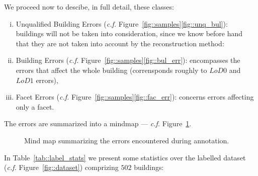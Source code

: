 \documentclass[a4paper, 11pt]{article}
\begin{document}
	We proceed now to descibe, in full detail, these classes:

	\begin{enumerate}[(i)]
		\item Unqualified Building Errors (\textit{c.f.} Figure~\ref{fig::samples}\ref{fig::unq_bul}): buildings will not be taken into consideration, since we know before hand that they are not taken into account by the reconstruction method:
		\item Building Errors (\textit{c.f.} Figure~\ref{fig::samples}\ref{fig::bul_err}): encompasses the errors that affect the whole building (corrensponds roughly to $LoD0$ and $LoD1$ errors),
		\item Facet Errors (\textit{c.f.} Figure~\ref{fig::samples}\ref{fig::fac_err}): concerns errors affecting only a facet.
	\end{enumerate}

	The errors are summarized into a mindmap --- \textit{c.f.} Figure~\ref{fig::mindmap_errors}.

	\begin{figure}
		\begin{center}
			
			\caption{\label{fig::mindmap_errors} Mind map summarizing the errors encountered during annotation.}
		\end{center}
	\end{figure}

	In Table~\ref{tab::label_stats} we present some statistics over the labelled dataset (\textit{c.f.} Figure~\ref{fig::dataset}) comprizing $502$ buildings:
\end{document}
